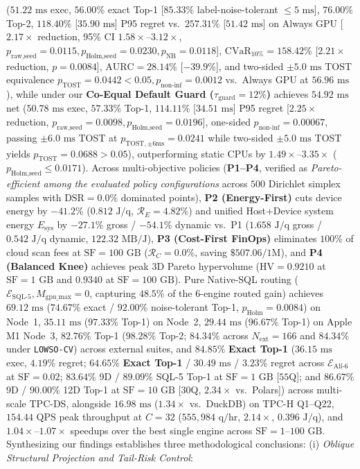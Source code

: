 \documentclass[10pt,a4paper]{article}
\begin{document}
($51.22\text{ ms}$ exec, $56.00\%$ exact Top-1 [$85.33\%$ label-noise-tolerant $\le 5\text{ ms}$], $76.00\%$ Top-2, $118.40\%$ [$35.90\text{ ms}$] P95 regret vs.\ $257.31\%$ [$51.42\text{ ms}$] on Always GPU [$2.17\times$ reduction, 95\% CI $1.58\times\text{--}3.12\times$, $p_{\text{raw,seed}}=0.0115, p_{\text{Holm,seed}}=0.0230, p_{\text{NB}}=0.0118$], $\text{CVaR}_{10\%}=158.42\%$ [$2.21\times$ reduction, $p=0.0084$], $\text{AURC}=28.14\%$ [$-39.9\%$], and two-sided $\pm 5.0\text{ ms}$ TOST equivalence $p_{\text{TOST}}=0.0442 < 0.05, p_{\text{non-inf}}=0.0012$ vs.\ Always GPU at $56.96\text{ ms}$), while under our \textbf{Co-Equal Default Guard ($\tau_{\text{guard}}=12\%$)} achieves $54.92\text{ ms}$ net ($50.78\text{ ms}$ exec, $57.33\%$ Top-1, $114.11\%$ [$34.51\text{ ms}$] P95 regret [$2.25\times$ reduction, $p_{\text{raw,seed}}=0.0098, p_{\text{Holm,seed}}=0.0196$], one-sided $p_{\text{non-inf}}=0.00067$, passing $\pm 6.0\text{ ms}$ TOST at $p_{\text{TOST},\pm 6\text{ms}}=0.0241$ while two-sided $\pm 5.0\text{ ms}$ TOST yields $p_{\text{TOST}}=0.0688 > 0.05$), outperforming static CPUs by $1.49\times\text{--}3.35\times$ ($p_{\text{Holm,seed}}\le 0.0171$). Across multi-objective policies (\textbf{P1--P4}, verified as \emph{Pareto-efficient among the evaluated policy configurations} across $500$ Dirichlet simplex samples with $\text{DSR}=0.0\%$ dominated points), \textbf{P2 (Energy-First)} cuts device energy by $-41.2\%$ ($0.812\text{ J/q}$, $\mathcal{R}_E=4.82\%$) and unified Host+Device system energy $E_{\text{sys}}$ by $-27.1\%$ gross / $-54.1\%$ dynamic vs.\ P1 ($1.658\text{ J/q}$ gross / $0.542\text{ J/q}$ dynamic, $122.32\text{ MB/J}$), \textbf{P3 (Cost-First FinOps)} eliminates $100\%$ of cloud scan fees at $\text{SF}=100\text{ GB}$ ($\mathcal{R}_C=0.0\%$, saving $\$507.06/1\text{M}$), and \textbf{P4 (Balanced Knee)} achieves peak 3D Pareto hypervolume ($\text{HV}=0.9210$ at $\text{SF}=1\text{ GB}$ and $0.9340$ at $\text{SF}=100\text{ GB}$). Pure Native-SQL routing ($\mathcal{E}_{\text{SQL-5}}, M_{\text{gpu\_max}}=0$, capturing $48.5\%$ of the 6-engine routed gain) achieves $69.12\text{ ms}$ ($74.67\%$ exact / $92.00\%$ noise-tolerant Top-1, $p_{\text{Holm}}=0.0084$) on Node~1, $35.11\text{ ms}$ ($97.33\%$ Top-1) on Node~2, $29.44\text{ ms}$ ($96.67\%$ Top-1) on Apple M1 Node~3, $82.76\%$ Top-1 ($98.28\%$ Top-2; $84.34\%$ across $N_{\text{ext}}=166$ and $84.34\%$ under \texttt{LOWSO-CV}) across external suites, and $\mathbf{84.85\%}$ \textbf{Exact Top-1} ($36.15\text{ ms}$ exec, $4.19\%$ regret; $\mathbf{64.65\%}$ \textbf{Exact Top-1} / $30.49\text{ ms}$ / $3.23\%$ regret across $\mathcal{E}_{\text{All-6}}$ at $\text{SF}=0.02$; $83.64\%$ 9D / $89.09\%$ SQL-5 Top-1 at $\text{SF}=1\text{ GB}$ [$55$Q]; and $86.67\%$ 9D / $90.00\%$ 12D Top-1 at $\text{SF}=10\text{ GB}$ [$30$Q, $2.34\times$ vs.\ Polars]) across multi-scale TPC-DS, alongside $16.98\text{ ms}$ ($1.34\times$ vs.\ DuckDB) on TPC-H Q1--Q22, $154.44\text{ QPS}$ peak throughput at $C=32$ ($555{,}984\text{ q/hr}$, $2.14\times$, $0.396\text{ J/q}$), and $1.04\times\text{--}1.07\times$ speedups over the best single engine across $\text{SF}=1\text{--}100\text{ GB}$. Synthesizing our findings establishes three methodological conclusions: (i) \textit{Oblique Structural Projection and Tail-Risk Control}: 
\end{document}
